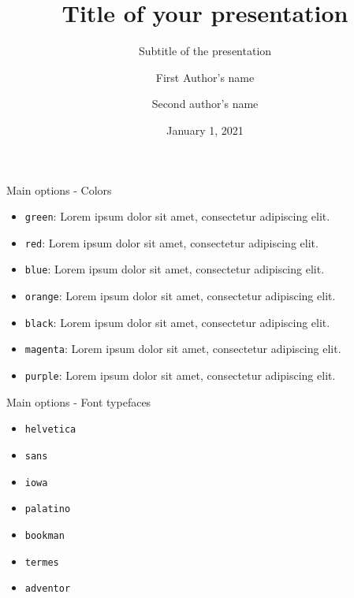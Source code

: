 \documentclass[10pt,numbering,toc]{bpslides}
\title[Short title]{Title of your presentation}
\subtitle{Subtitle of the presentation}
\author[Short Authors Name]{First Author's name\inst{1} \and Second author's name\inst{2}}
\institute{\inst{1} First institute\vs\\\inst{2} Second institute}
\date[Short date]{January 1, 2021}
\begin{document}
\begin{frame}[plain]
	\titlepage
\end{frame}

\begin{frame}{Main options - Colors}\label{firstslide}
\begin{itemize}
\item \texttt{green}: {\color{green0}Lorem ipsum dolor sit amet, consectetur adipiscing elit}.\hfill {}
\item \texttt{red}: {\color{red0}Lorem ipsum dolor sit amet, consectetur adipiscing elit}.
\item \texttt{blue}: {\color{blue0}Lorem ipsum dolor sit amet, consectetur adipiscing elit}.
\item \texttt{orange}: {\color{orange0}Lorem ipsum dolor sit amet, consectetur adipiscing elit}.
\item \texttt{black}: {\color{black}Lorem ipsum dolor sit amet, consectetur adipiscing elit}.
\item \texttt{magenta}: {\color{magenta0}Lorem ipsum dolor sit amet, consectetur adipiscing elit}.
\item \texttt{purple}: {\color{purple0}Lorem ipsum dolor sit amet, consectetur adipiscing elit}.
\end{itemize}
\end{frame}

\begin{frame}{Main options - Font typefaces}\label{firstslide}
\begin{itemize}
\item \texttt{helvetica}
\item \texttt{sans}
\item \texttt{iowa}
\item \texttt{palatino}
\item \texttt{bookman}
\item \texttt{termes}
\item \texttt{adventor}
\end{itemize}
\end{frame}
\end{document}
